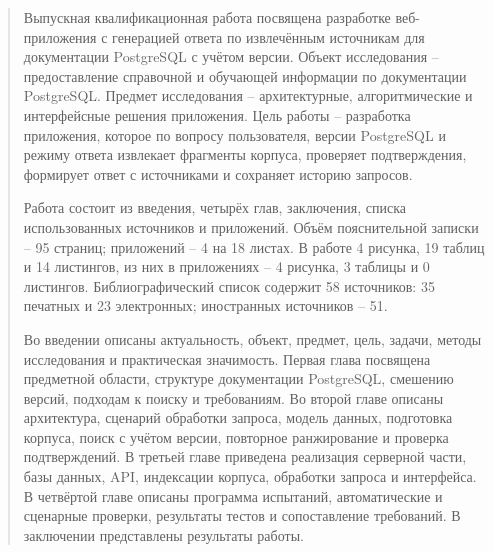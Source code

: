 \begin{abstract}
\thispagestyle{empty}

Выпускная квалификационная работа посвящена разработке веб-приложения с генерацией ответа по извлечённым источникам для документации PostgreSQL с учётом версии. Объект исследования -- предоставление справочной и обучающей информации по документации PostgreSQL. Предмет исследования -- архитектурные, алгоритмические и интерфейсные решения приложения. Цель работы -- разработка приложения, которое по вопросу пользователя, версии PostgreSQL и режиму ответа извлекает фрагменты корпуса, проверяет подтверждения, формирует ответ с источниками и сохраняет историю запросов.

Работа состоит из введения, четырёх глав, заключения, списка использованных источников и приложений. Объём пояснительной записки -- 95 страниц; приложений -- 4 на 18 листах. В работе 4 рисунка, 19 таблиц и 14 листингов, из них в приложениях -- 4 рисунка, 3 таблицы и 0 листингов. Библиографический список содержит 58 источников: 35 печатных и 23 электронных; иностранных источников -- 51.

Во введении описаны актуальность, объект, предмет, цель, задачи, методы исследования и практическая значимость. Первая глава посвящена предметной области, структуре документации PostgreSQL, смешению версий, подходам к поиску и требованиям. Во второй главе описаны архитектура, сценарий обработки запроса, модель данных, подготовка корпуса, поиск с учётом версии, повторное ранжирование и проверка подтверждений. В третьей главе приведена реализация серверной части, базы данных, API, индексации корпуса, обработки запроса и интерфейса. В четвёртой главе описаны программа испытаний, автоматические и сценарные проверки, результаты тестов и сопоставление требований. В заключении представлены результаты работы.
\end{abstract}
